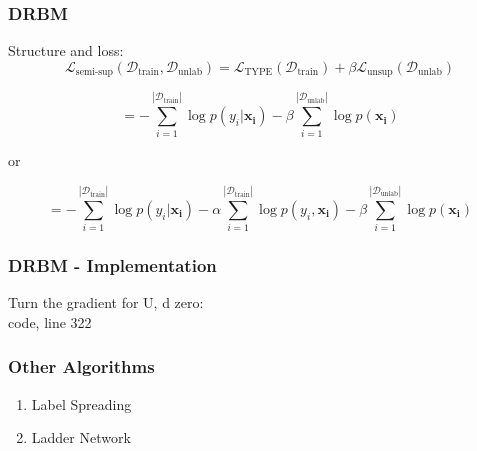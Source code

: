 \documentclass{beamer}
\begin{document}
\begin{frame}
\frametitle{DRBM}

Structure and loss:\\

$$ \mathcal{L}_{\text{semi-sup}} (\mathcal{D}_{\text{train}} , \mathcal{D}_{\text{unlab}}) = \mathcal{L}_{\text{TYPE}}(\mathcal{D}_{\text{train}}) + \beta \mathcal{L}_{\text{unsup}} (\mathcal{D}_{\text{unlab}}) $$


$$ = -\sum_{i=1}^{|\mathcal{D}_{\text{train}}|} \log p(y_i | \mathbf{x_i}) - \beta \sum_{i=1}^{|\mathcal{D}_{\text{unlab}}|} \log p(\mathbf{x_i}) $$

or 

$$ = -\sum_{i=1}^{|\mathcal{D}_{\text{train}}|} \log p(y_i | \mathbf{x_i}) -\alpha \sum_{i=1}^{|\mathcal{D}_{\text{train}}|} \log p(y_i , \mathbf{x_i}) - \beta \sum_{i=1}^{|\mathcal{D}_{\text{unlab}}|} \log p(\mathbf{x_i}) $$

\end{frame}
\begin{frame}
\frametitle{DRBM - Implementation}

Turn the gradient for U, d zero:\\

code, line 322

\end{frame}
\begin{frame}
\frametitle{Other Algorithms}

\begin{enumerate}
\item Label Spreading \\ 

\item Ladder Network \\

\end{enumerate}

\end{frame}
\end{document}
